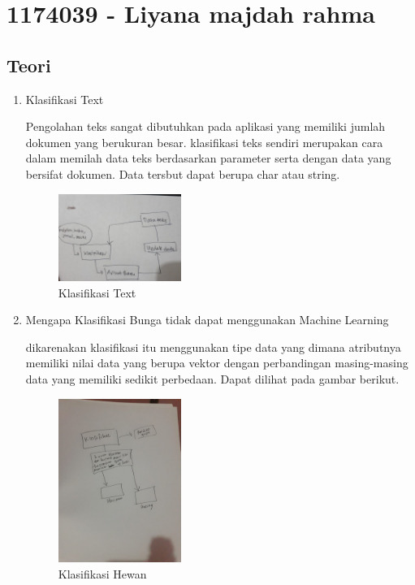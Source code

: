 \section{1174039 - Liyana majdah rahma}
    \subsection{Teori}
    \begin{enumerate}
        \item Klasifikasi Text
        
        Pengolahan teks sangat dibutuhkan pada aplikasi yang memiliki jumlah dokumen yang berukuran besar. klasifikasi teks sendiri merupakan cara dalam memilah data teks berdasarkan parameter serta dengan data yang bersifat dokumen. Data tersbut dapat berupa char atau string.
        \begin{figure}[H]
            \includegraphics[width=4cm]{figures/1174039/chapter4/klasifikasi.jpg}
            \centering
            \caption{Klasifikasi Text}
        \end{figure}

        \item Mengapa Klasifikasi Bunga tidak dapat menggunakan Machine Learning
        
        dikarenakan klasifikasi itu menggunakan tipe data yang dimana atributnya memiliki nilai data yang berupa vektor dengan perbandingan masing-masing data yang memiliki sedikit perbedaan. Dapat dilihat pada gambar berikut.
        \begin{figure}[H]
            \includegraphics[width=4cm]{figures/1174039/chapter4/hewan.jpeg}
            \centering
            \caption{Klasifikasi Hewan}
        \end{figure}


\end{enumerate}
